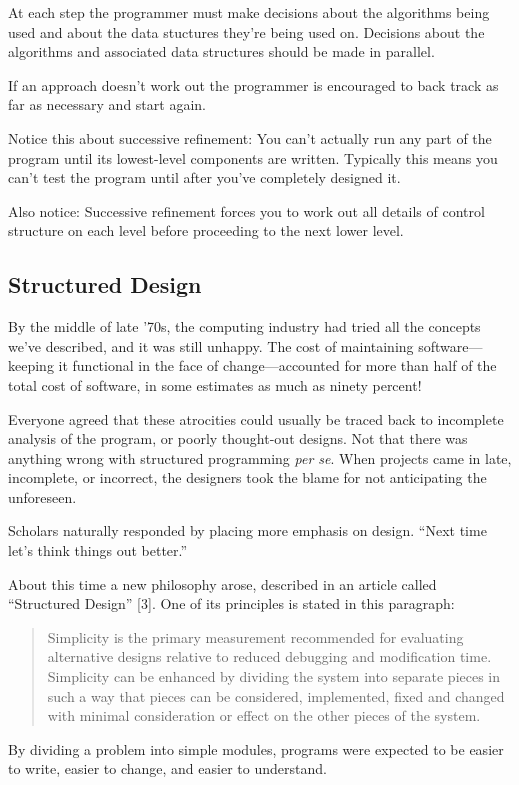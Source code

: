 At each step the programmer must make decisions about the algorithms
being used and about the data stuctures they're being used on. Decisions
about the algorithms and associated data structures should be made
in parallel.

If an approach doesn't work out the programmer is encouraged to back
track as far as necessary and start again.

Notice this about successive refinement: You can't actually run any
part of the program until its lowest-level components are written.
Typically this means you can't test the program until after you've
completely designed it. 

Also notice: Successive refinement forces you to work out all details
of control structure on each level before proceeding to the next lower
level.


\subsection*{Structured Design}

By the middle of late '70s, the computing industry had tried all the
concepts we've described, and it was still unhappy. The cost of maintaining
software---keeping it functional in the face of change---accounted
for more than half of the total cost of software, in some estimates
as much as ninety percent! 

Everyone agreed that these atrocities could usually be traced back
to incomplete analysis of the program, or poorly thought-out designs.
Not that there was anything wrong with structured programming \emph{per
se}. When projects came in late, incomplete, or incorrect, the designers
took the blame for not anticipating the unforeseen. 

Scholars naturally responded by placing more emphasis on design. {}``Next
time let's think things out better.''

About this time a new philosophy arose, described in an article called
``Structured Design'' {[}3{]}. One of its principles is stated in
this paragraph: 

\begin{quote}
Simplicity is the primary measurement recommended for evaluating alternative
designs relative to reduced debugging and modification time. Simplicity
can be enhanced by dividing the system into separate pieces in such
a way that pieces can be considered, implemented, fixed and changed
with minimal consideration or effect on the other pieces of the system.
\end{quote}
By dividing a problem into simple modules, programs were expected
to be easier to write, easier to change, and easier to understand.


